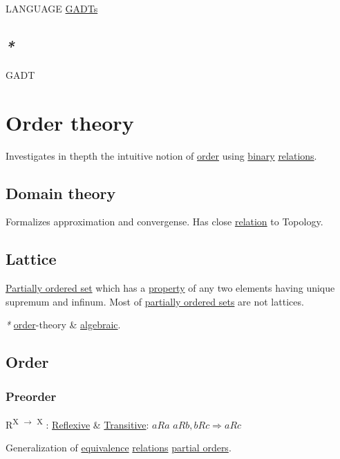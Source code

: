 \documentclass[a4paper,14pt,oneside]{book}
\begin{document}
LANGUAGE \hyperref[org2aa0569]{GADTs}

\section{\emph{*}}
\label{sec:org1c91c11}

\label{org62f7589}GADT

\chapter{\label{orgd8099fe}Order theory}
\label{sec:org043b08c}

Investigates in thepth the intuitive notion of \hyperref[org346af6d]{order} using \hyperref[org66cafdd]{binary} \hyperref[org9e83085]{relations}.

\section{\label{orgf10459a}Domain theory}
\label{sec:orgadb1abc}

Formalizes approximation and convergense.
Has close \hyperref[org1512a6f]{relation} to Topology.

\section{\label{org5d89078}Lattice}
\label{sec:org3421377}

\hyperref[org1ebf1b4]{Partially ordered set} which has a \hyperref[orgc961e31]{property} of any two elements having unique supremum and infinum.
Most of \hyperref[org674a210]{partially ordered sets} are not lattices.

\emph{*} \hyperref[org346af6d]{order}-theory \& \hyperref[org4a303fc]{algebraic}.

\section{\label{org346af6d}Order}
\label{sec:org902e389}

\subsection{\label{org614ed74}Preorder}
\label{sec:org4e12ccc}

R\textsuperscript{X \(\to\) X} : \hyperref[orgd7aac37]{Reflexive} \& \hyperref[org141a3a1]{Transitive}:
\(aRa\)
\(aRb, bRc \Rightarrow aRc\)

Generalization of \hyperref[orgcbf1d90]{equivalence} \hyperref[org9e83085]{relations} \hyperref[orga792432]{partial orders}.
\end{document}
